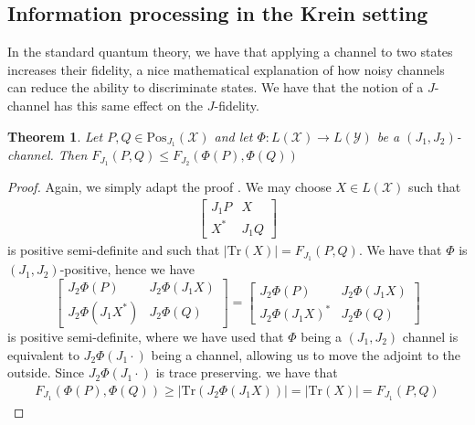 \documentclass{amsart}
\numberwithin{equation}{section}
\newtheorem{theorem}{Theorem}[section]
\theoremstyle{definition}
\theoremstyle{plain}
\theoremstyle{solutionstyle}
\begin{document}
\subsection{Information processing in the Krein setting}
In the standard quantum theory, we have that applying a channel to two states increases their fidelity, a nice mathematical explanation of how noisy channels can reduce the ability to discriminate states. We have that the notion of a $J$-channel has this same effect on the $J$-fidelity. 
\begin{theorem}
    Let $P,Q\in \mathrm{Pos}_{J_1}(\mathcal{X})$ and let $\Phi:L(\mathcal{X})\to L(\mathcal{Y})$ be a $(J_1,J_2)$-channel. Then
    $F_{J_1}(P,Q)\leq F_{J_2}(\Phi(P),\Phi(Q))$
\end{theorem}
\begin{proof}
Again, we simply adapt the proof \citep[p.~156]{Watrous_2018}.
    We may choose $X\in L(\mathcal{X})$ such that 
    \begin{align*}
        \begin{bmatrix}
J_1P & X \\
X^* & J_1Q
\end{bmatrix}
    \end{align*}
    is positive semi-definite
    and such that $|\mathrm{Tr}(X)|=F_{J_1}(P,Q)$. We have that $\Phi$ is $(J_1,J_2)$-positive, hence we have 
\begin{equation*}
\begin{bmatrix}
J_2\Phi(P) & J_2\Phi(J_1X) \\
J_2\Phi(J_1X^*) & J_2\Phi(Q)
\end{bmatrix}=\begin{bmatrix}
J_2\Phi(P) & J_2\Phi(J_1X) \\
J_2\Phi(J_1X)^* & J_2\Phi(Q)
\end{bmatrix}
\end{equation*}
is positive semi-definite, where we have used that $\Phi$ being a $(J_1,J_2)$ channel is equivalent to $J_2\Phi(J_1\cdot)$ being a channel, allowing us to move the adjoint to the outside. Since $J_2\Phi(J_1\cdot)$ is trace preserving. we have that 
\begin{align*}
    F_{J_1}(\Phi(P),\Phi(Q))\geq |\mathrm{Tr}(J_2\Phi(J_1X))|=|\mathrm{Tr}(X)|=F_{J_1}(P,Q)
\end{align*}
\end{proof}
\end{document}
